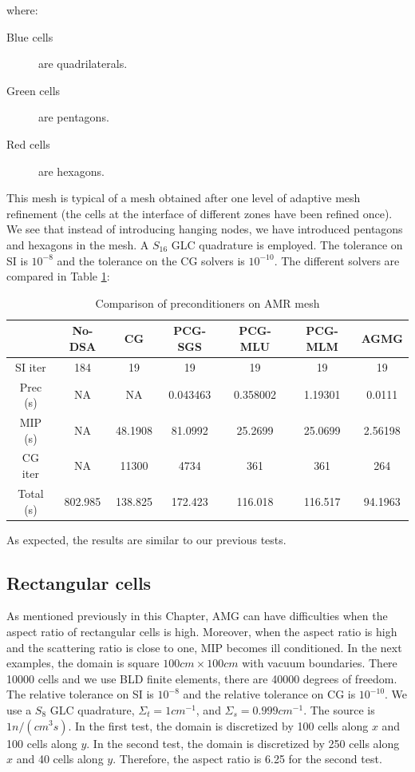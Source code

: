 where:
\begin{description}
  \item[Blue cells] are quadrilaterals.
  \item[Green cells] are pentagons.
  \item[Red cells] are hexagons.
\end{description}
This mesh is typical of a mesh obtained after one level of adaptive mesh
refinement (the cells at the interface of different zones have been refined
once). We see that instead of introducing hanging nodes, we have introduced
pentagons and hexagons in the mesh.
A $S_{16}$ GLC quadrature is employed. The tolerance on SI is $10^{-8}$ and
the tolerance on the CG solvers is $10^{-10}$.
The different solvers are compared in Table \ref{tab_6}:
\begin{table}[H]
  \caption{Comparison of preconditioners on AMR mesh}
  \begin{center}
    \begin{tabular}{|c|c|c|c|c|c|c|}
      \hline
       & No-DSA & CG & PCG-SGS & PCG-MLU & PCG-MLM & AGMG \\
      \hline
      SI iter    & 184     & 19      & 19       & 19      & 19       & 19 \\
      Prec (s)   & NA      & NA      & 0.043463 & 0.358002 & 1.19301 & 0.0111\\
      MIP (s)    & NA      & 48.1908 & 81.0992  & 25.2699 & 25.0699  & 
      2.56198\\
      CG iter    & NA      & 11300   & 4734     & 361     & 361      & 264 \\
      Total (s)  & 802.985 & 138.825 & 172.423  & 116.018 & 116.517  &
      94.1963\\
      \hline
    \end{tabular}
    \label{tab_6}
  \end{center}
\end{table}
As expected, the results are similar to our previous tests.

\subsection{Rectangular cells}
As mentioned previously in this Chapter, AMG can have difficulties when the
aspect ratio of rectangular cells is high. Moreover, when the aspect ratio is
high and the scattering ratio is close to one, MIP becomes ill conditioned. 
In the next examples, the domain is square $100cm \times 100cm$ with vacuum 
boundaries. There 10000 cells and we use BLD finite elements, 
there are 40000 degrees of freedom. The relative tolerance on SI is $10^{-8}$ 
and the relative tolerance on CG is $10^{-10}$. We use a $S_{8}$ GLC quadrature, 
$\Sigma_t = 1 cm^{-1}$, and $\Sigma_s = 0.999 cm^{-1}$. The source is
$1n/(cm^3s)$. In the first test, the domain is discretized by 100 cells along
$x$ and 100 cells along $y$. In the second test, the domain is discretized by
250 cells along $x$ and 40 cells along $y$. Therefore, the aspect ratio is 6.25
for the second test.


